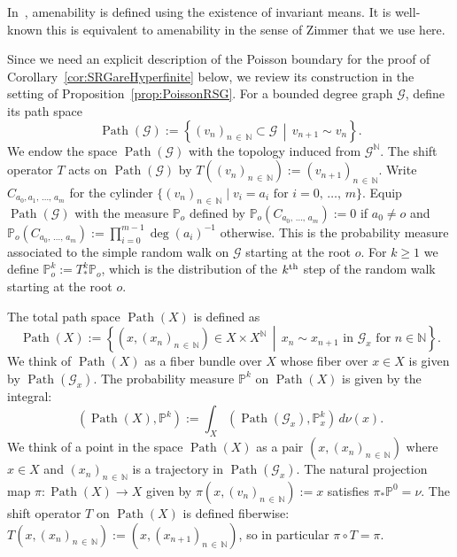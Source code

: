 \documentclass[AHL,Unicode,longabstracts,published]{cedram}
\DeclareMathOperator{\Path}{Path}
\newcommand{\bbN}{\mathbb{N}}
\newcommand{\bbP}{\mathbb{P}}
\newcommand{\calG}{\mathcal{G}}
\begin{document}
\begin{rema}
In~\cite{Kai05}, amenability is defined using the existence of invariant means. It is well-known this is equivalent to amenability in the sense of Zimmer that we use here.
\end{rema}

Since we need an explicit description of the Poisson boundary for the proof of Corollary~\ref{cor:SRGareHyperfinite} below, we review its construction in the setting of Proposition~\ref{prop:PoissonRSG}.
For a bounded degree graph $\calG$, define its path space
\[
\Path(\calG):=\left\{(v_n)_{n\,\in\,\bbN}\subset \calG \,\middle|\, v_{n+1}\sim v_n\right\}.
\]
We endow the space $\Path(\calG)$ with the topology induced from $\calG^\bbN$. The shift operator $T$ acts on $\Path(\calG)$ by $T((v_n)_{n\,\in\,\bbN}):=(v_{n+1})_{n\,\in\,\bbN}.$ Write $C_{a_0,a_1,\,\ldots,\,a_m}$ for the cylinder $\{(v_n)_{n\,\in\,\bbN} \mid v_i=a_i \text{ for } i=0,\,\ldots,\,m\}.$
Equip $\Path(\calG)$ with the measure $\bbP_o$ defined by $\bbP_o(C_{a_0,\,\ldots,\,a_m}):=0$ if $a_0\neq o$ and $\bbP_o(C_{a_0,\,\ldots,\,a_m}):=\prod_{i=0}^{m-1} \deg(a_i)^{-1}$ otherwise. This is the probability measure associated to the simple random walk on $\calG$ starting at the root $o$. For $k\geq 1$ we define $\bbP_o^k:=T^k_*\bbP_o$, which is the distribution of the $k^{\rm th}$ step of the random walk starting at the root $o$.

The total path space $\Path(X)$ is defined as
\[
\Path(X):=\left\{(x,(x_n)_{n\,\in\,\bbN})\in X\times X^{\bbN}\,\middle|\, x_n\sim x_{n+1} \text{ in } \calG_x \text { for } n\in \bbN\right\}.
\]
We think of $\Path(X)$ as a fiber bundle over $X$ whose fiber over $x\in X$ is given by $\Path(\calG_x)$. The probability measure $\bbP^k$ on $\Path(X)$ is given by the integral:
\[
\left(\Path(X),\bbP^k\right):=\int_X \left(\Path(\calG_x),\bbP_x^k\right) \, d\nu(x).
\]
We think of a point in the space $\Path(X)$ as a pair $(x, (x_n)_{n\,\in\,\bbN})$ where $x\in X$ and $(x_n)_{n\,\in\,\bbN}$ is a trajectory in $\Path(\calG_x).$ The natural projection map $\pi: \Path(X) \to X$ given by $\pi(x,(v_n)_{n\,\in\,\bbN}):=x$ satisfies $\pi_*\bbP^0=\nu$. The shift operator $T$ on $\Path(X)$ is defined fiberwise: $T(x,(x_n)_{n\,\in\,\bbN}):=(x,(x_{n+1})_{n\,\in\,\bbN})$, so in particular $\pi \circ T=\pi.$
\end{document}

